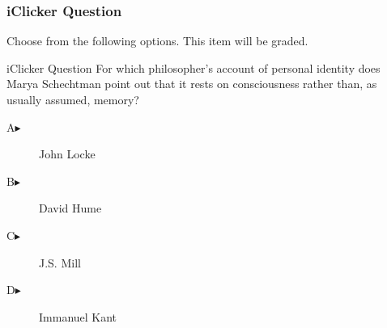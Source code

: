 \begin{frame}
  \frametitle{iClicker Question}
Choose from the following options. This item will be graded.
\begin{block}{iClicker Question}
For which philosopher's account of personal identity does Marya
Schechtman point out that it rests on consciousness rather than, as
usually assumed, memory?
\end{block}
\begin{description}
\item[A\hspace{.2in}$\blacktriangleright$] John Locke
\item[B\hspace{.2in}$\blacktriangleright$] David Hume
\item[C\hspace{.2in}$\blacktriangleright$] J.S. Mill
\item[D\hspace{.2in}$\blacktriangleright$] Immanuel Kant
\end{description}
\end{frame}
